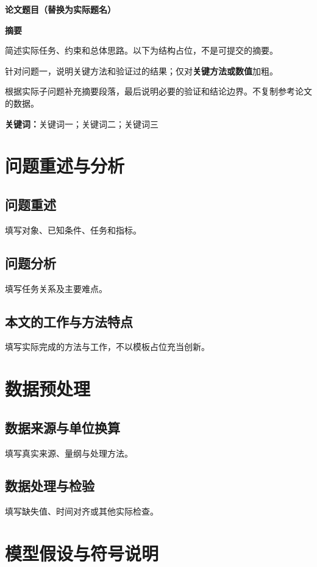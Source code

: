 \documentclass[UTF8,12pt,a4paper,fontset=fandol]{ctexart}
\begin{document}
\begin{center}
  {\fontsize{18}{24}\selectfont\bfseries 论文题目（替换为实际题名）\par}
  \vspace{14pt}
  {\Large\bfseries 摘要\par}
\end{center}
\vspace{8pt}
简述实际任务、约束和总体思路。以下为结构占位，不是可提交的摘要。

针对问题一，说明关键方法和验证过的结果；仅对\textbf{关键方法或数值}加粗。

根据实际子问题补充摘要段落，最后说明必要的验证和结论边界。不复制参考论文的数据。

\noindent\textbf{关键词：}关键词一；关键词二；关键词三
\clearpage

\section{问题重述与分析}
\subsection{问题重述}
填写对象、已知条件、任务和指标。
\subsection{问题分析}
填写任务关系及主要难点。
\subsection{本文的工作与方法特点}
填写实际完成的方法与工作，不以模板占位充当创新。

\section{数据预处理}
\subsection{数据来源与单位换算}
填写真实来源、量纲与处理方法。
\subsection{数据处理与检验}
填写缺失值、时间对齐或其他实际检查。

\section{模型假设与符号说明}
\end{document}
